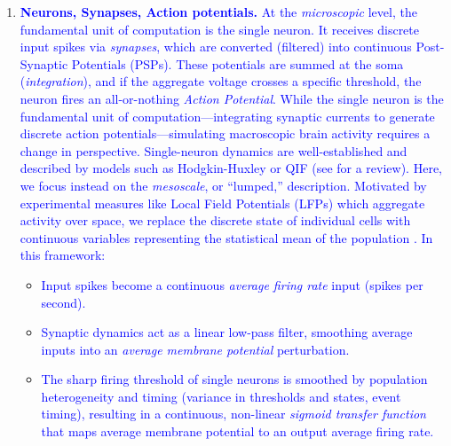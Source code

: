\documentclass[12pt]{article}
\numberwithin{equation}{section}
\newcommand{\rev}[1]{\textcolor{blue}{#1}}
\begin{document}
\begin{enumerate}
\item \rev{ \textbf{Neurons, Synapses, Action potentials.} 
At the \textit{microscopic} level, the fundamental unit of computation is the single neuron. It receives discrete input spikes via \emph{synapses}, which are converted (filtered) into continuous Post-Synaptic Potentials (PSPs). These potentials are summed at the soma (\emph{integration}), and if the aggregate voltage crosses a specific threshold, the neuron fires an all-or-nothing \emph{Action Potential}.  
While the single neuron is the fundamental unit of computation—integrating synaptic currents to generate discrete action potentials—simulating macroscopic brain activity requires a change in perspective. Single-neuron dynamics are well-established and described by models such as Hodgkin-Huxley or QIF (see \cite{ermentroutMathematicalFoundationsNeuroscience2010, trappenbergFundamentalsComputationalNeuroscience2023, dayan_theoretical_2001} for a review). 
Here, we focus instead on the \textit{mesoscale}, or ``lumped,'' description. Motivated by experimental measures like Local Field Potentials (LFPs) which aggregate activity over space, we replace the discrete state of individual cells with continuous variables representing the statistical mean of the population \cite{trappenbergFundamentalsComputationalNeuroscience2023, dayan_theoretical_2001}. In this framework:}


\begin{itemize}
    \item \rev{ Input spikes become a continuous \emph{average firing rate} input (spikes per second).}
    \item \rev{ Synaptic dynamics act as a linear low-pass filter, smoothing average inputs into an \emph{average membrane potential} perturbation.}
    \item \rev{The sharp firing threshold of single neurons is smoothed by population heterogeneity and timing (variance in thresholds and states, event timing), resulting in a continuous, non-linear \emph{sigmoid transfer function} that maps average membrane potential to an output average firing rate.}
\end{itemize}
 

\end{enumerate}
\end{document}

